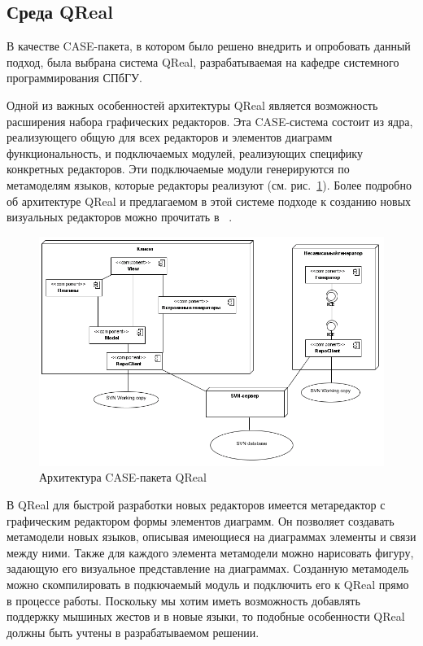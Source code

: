 \documentclass[a5paper]{article}
\begin{document}
\subsection{Среда QReal}
В качестве CASE-пакета, в котором было решено внедрить и опробовать данный подход, была выбрана система QReal, разрабатываемая на кафедре системного программирования СПбГУ. 

Одной из важных особенностей архитектуры QReal является возможность расширения набора графических редакторов. Эта CASE-система состоит из ядра, реализующего общую для всех редакторов и элементов диаграмм функциональность, и подключаемых модулей, реализующих специфику конкретных редакторов. Эти подключаемые модули генерируются по метамоделям языков, которые редакторы реализуют (см. рис.~\ref{architecture}). Более подробно об архитектуре QReal и предлагаемом в этой системе подходе к  созданию новых визуальных редакторов можно прочитать в ~\cite{qreal}. 

\begin{figure} [ht]
  \begin{center}
    \includegraphics[width=1\textwidth, bb=0 0 798 531]{01-architecture.png}
    \caption{Архитектура CASE-пакета QReal}
    \label{architecture}
  \end{center}
\end{figure}

В QReal для быстрой разработки новых редакторов имеется метаредактор с графическим редактором формы элементов диаграмм. Он позволяет создавать метамодели новых языков, описывая имеющиеся на диаграммах элементы и связи между ними. Также для каждого элемента метамодели можно нарисовать фигуру, задающую его визуальное представление на диаграммах. Созданную метамодель можно скомпилировать в подкючаемый модуль и подключить его к QReal прямо в процессе работы. Поскольку мы хотим иметь возможность добавлять поддержку мышиных жестов и в новые языки, то подобные особенности QReal должны быть учтены в разрабатываемом решении. 
\end{document}
